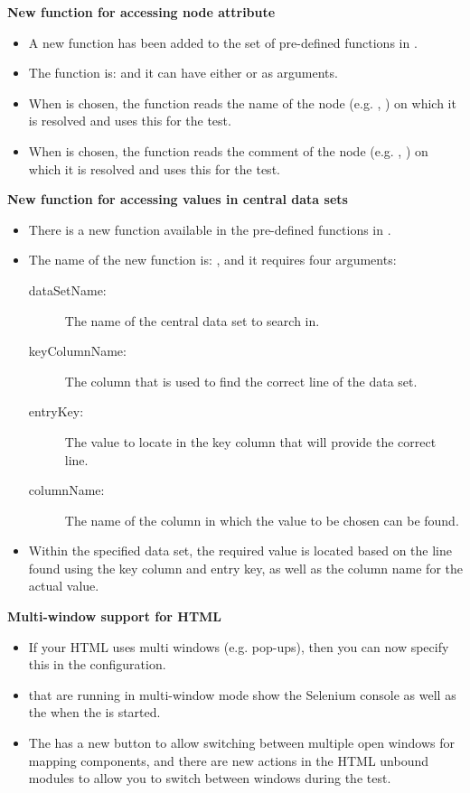 \textbf{New function for accessing node attribute}
\begin{itemize}
\item A new function has been added to the set of pre-defined functions in \app{}.
\item The function is:  and it can have either  or  as arguments.
\item When  is chosen, the function reads the name of the node (e.g. \gdcase{}, \gdstep{}) on which it is resolved and uses this for the test.
\item  When  is chosen, the function reads the comment of the node (e.g. \gdcase{}, \gdstep{}) on which it is resolved and uses this for the test.
\end{itemize}

\textbf{New function for accessing values in central data sets}
\begin{itemize}
\item There is a new function available in the pre-defined functions in \app{}.
\item The name of the new function is: , and it requires four arguments:
\begin{description}
\item [dataSetName:]{The name of the central data set to search in.}
\item [keyColumnName:]{The column that is used to find the correct line of the data set.}
\item [entryKey:]{The value to locate in the key column that will provide the correct line.}
\item [columnName:]{The name of the column in which the value to be chosen can be found.}
\end{description}
\item Within the specified data set, the required value is located based on the line found using the key column and entry key, as well as the column name for the actual value. 
\end{itemize}

\textbf{Multi-window support for HTML \gdauts{}}
\begin{itemize}
\item If your HTML \gdaut{} uses multi windows (e.g. pop-ups), then you can now specify this in the \gdaut{} configuration. 
\item \gdauts{} that are running in multi-window mode show the Selenium console as well as the \gdaut{} when the \gdaut{} is started. 
\item The \gdomeditor{} has a new button to allow switching between multiple open windows for mapping components, and there are new actions in the HTML unbound modules to allow you to switch between windows during the test. 
\end{itemize}

